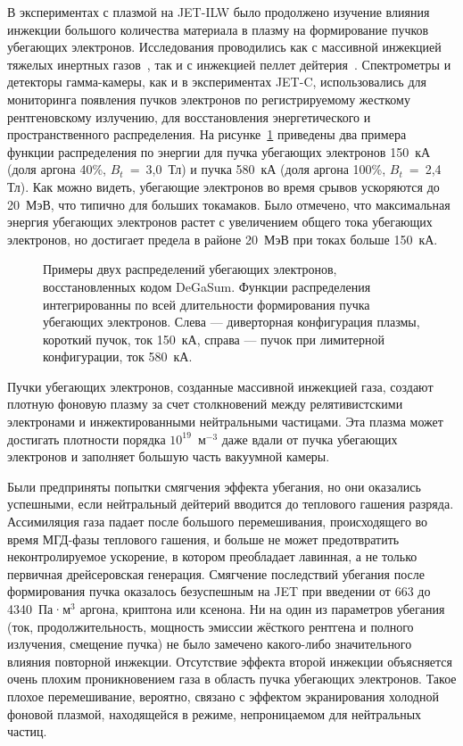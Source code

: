 В экспериментах с плазмой на JET-ILW было продолжено изучение влияния инжекции большого количества материала в плазму на формирование пучков убегающих электронов. Исследования проводились как с массивной инжекцией тяжелых инертных газов~\cite{Reux2015_Mit,Reux2015}, так и с инжекцией пеллет дейтерия~\cite{Reux2022}. Спектрометры и детекторы гамма-камеры, как и в экспериментах JET-C, использовались для мониторинга появления пучков электронов по регистрируемому жесткому рентгеновскому излучению, для восстановления энергетического и пространственного распределения. На рисунке~\ref{fig:jetRunawayEdfReux} приведены два примера функции распределения по энергии для пучка убегающих электронов 150~кА (доля аргона 40\%, $B_t$~=~3,0~Тл) и пучка 580~кА (доля аргона 100\%, $B_t$~=~2,4 Тл). Как можно видеть, убегающие электронов во время срывов ускоряются до 20~МэВ, что типично для больших токамаков. Было отмечено, что максимальная энергия убегающих электронов растет с увеличением общего тока убегающих электронов, но достигает предела в районе 20~МэВ при токах больше 150~кА.~\cite{Reux2015_Mit}

\begin{figure}[ht!]
  \caption{Примеры двух распределений убегающих электронов, восстановленных кодом DeGaSum. Функции распределения интегрированны по всей длительности формирования пучка убегающих электронов. Слева --- диверторная конфигурация плазмы, короткий пучок, ток 150~кА, справа --- пучок при лимитерной конфигурации, ток 580~кА.~\cite{Reux2015_Mit} }
  \label{fig:jetRunawayEdfReux}
\end{figure}

Пучки убегающих электронов, созданные массивной инжекцией газа, создают плотную фоновую плазму за счет столкновений между релятивистскими электронами и инжектированными нейтральными частицами. Эта плазма может достигать плотности порядка $10^{19}$~м${}^{-3}$ даже вдали от пучка убегающих электронов и заполняет большую часть вакуумной камеры. 

Были предприняты попытки смягчения эффекта убегания, но они оказались успешными, если нейтральный дейтерий вводится до теплового гашения разряда. Ассимиляция газа падает после большого перемешивания, происходящего во время МГД-фазы теплового гашения, и больше не может предотвратить неконтролируемое ускорение, в котором преобладает лавинная, а не только первичная дрейсеровская генерация. Смягчение последствий убегания после формирования пучка оказалось безуспешным на JET при введении от 663 до 4340~Па·м${}^{3}$ аргона, криптона или ксенона. Ни на один из параметров убегания (ток, продолжительность, мощность эмиссии жёсткого рентгена и полного излучения, смещение пучка) не было замечено какого-либо значительного влияния повторной инжекции. Отсутствие эффекта второй инжекции объясняется очень плохим проникновением газа в область пучка убегающих электронов. Такое плохое перемешивание, вероятно, связано с эффектом экранирования холодной фоновой плазмой, находящейся в режиме, непроницаемом для нейтральных частиц.~\cite{Reux2015_Mit}

